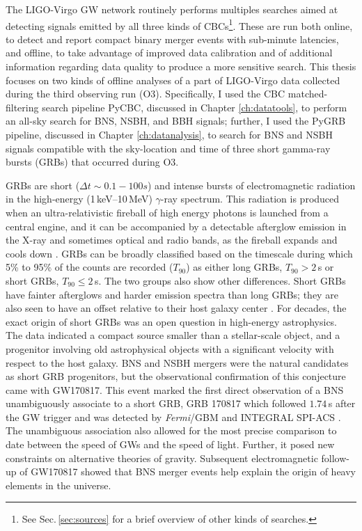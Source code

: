 \documentclass[binding=0.6cm, LaM]{sapthesis}
\begin{document}
	The LIGO-Virgo GW network routinely performs multiples searches aimed at detecting signals 
	emitted by all three kinds of CBCs\footnote{See Sec.\,\ref{sec:sources} for a brief overview of other kinds of searches.}.
        These are run both online, to detect and report compact binary merger events 
	with sub-minute latencies, and offline, to take advantage of improved data calibration 	
	and of additional information regarding data quality to produce a more sensitive search.
	This thesis focuses on two kinds of offline analyses of a part of LIGO-Virgo data collected during the third observing run (O3).
        Specifically, I used the CBC matched-filtering search pipeline {\ttfamily PyCBC}, discussed in Chapter \ref{ch:datatools}, 
	to perform an all-sky search for BNS, NSBH, and BBH signals; further, I used the {\ttfamily PyGRB} pipeline, 
	discussed in Chapter \ref{ch:datanalysis}, to search for BNS and NSBH signals compatible 
	with the sky-location and time of three short gamma-ray bursts (GRBs) that occurred during O3.

	GRBs are short ($\Delta t \sim 0.1-100s$) and intense bursts of 
	electromagnetic radiation in the high-energy (1\,keV--10\,MeV) $\gamma$-ray spectrum.
	This radiation is produced when an ultra-relativistic fireball of high energy photons 
	is launched from a central engine, and it can be accompanied by a detectable afterglow emission 
	in the X-ray and sometimes optical and radio bands, as the fireball expands and cools down \cite{139}.
	GRBs can be broadly classified based on the timescale during which 5\% to 95\% of the counts are recorded ($T_{90}$)
	as either long GRBs, $T_{90} > 2\,$s or short GRBs, $T_{90} \leq 2\,$s.
	The two groups also show other differences.  
	Short GRBs have fainter afterglows and harder emission spectra than long GRBs; 
	they are also seen to have an offset relative to their host galaxy center \cite{154}.
	For decades, the exact origin of short GRBs was an open question in high-energy astrophysics.  
	The data indicated a compact source smaller than a stellar-scale object, 
	and a progenitor involving old astrophysical objects with a significant velocity with respect to the host galaxy.  
	BNS and NSBH mergers were the natural candidates as short GRB progenitors, 
	but the observational confirmation of this conjecture came with GW170817.
	This event marked the first direct observation of a BNS unambiguously associate to a short GRB, 
	GRB 170817 which followed $1.74\,$s after the GW trigger and was detected by {\it Fermi}/GBM and INTEGRAL SPI-ACS \cite{15}.
	The unambiguous association also allowed for the most precise comparison to date
	between the speed of GWs and the speed of light.  
	Further, it posed new constraints on alternative theories of gravity. 
	Subsequent electromagnetic follow-up of GW170817 showed that BNS merger events 
	help explain the origin of heavy elements in the universe.
\end{document}
